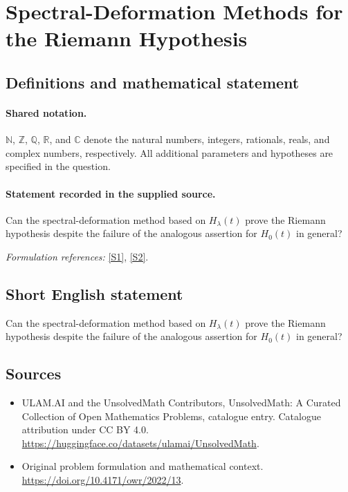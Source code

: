 \documentclass[11pt]{article}
\newcommand{\sref}[2]{\hyperlink{source:#1:#2}{[S#2]}}
\begin{document}
\section{Spectral-Deformation Methods for the Riemann Hypothesis}\label{statement}

\subsection{Definitions and mathematical statement}

\paragraph{Shared notation.}$\mathbb N$, $\mathbb Z$, $\mathbb Q$, $\mathbb R$, and $\mathbb C$ denote the natural numbers, integers, rationals, reals, and complex numbers, respectively. All additional parameters and hypotheses are specified in the question.


\paragraph{Statement recorded in the supplied source.}
Can the spectral-deformation method based on $H_\lambda(t)$ prove the Riemann hypothesis despite the failure of the analogous assertion for $H_0(t)$ in general?
\par\smallskip\textit{Formulation references:} \sref{statement}{1}, \sref{statement}{2}.
\subsection{Short English statement}
Can the spectral-deformation method based on $H_\lambda(t)$ prove the Riemann hypothesis despite the failure of the analogous assertion for $H_0(t)$ in general?
\subsection{Sources}
\begin{itemize}
\item[\hypertarget{source:statement:1}{S1}] ULAM.AI and the UnsolvedMath Contributors, UnsolvedMath: A Curated Collection of Open Mathematics Problems, catalogue entry. Catalogue attribution under CC BY 4.0.
\url{https://huggingface.co/datasets/ulamai/UnsolvedMath}.
\item[\hypertarget{source:statement:2}{S2}] Original problem formulation and mathematical context.
\url{https://doi.org/10.4171/owr/2022/13}.
\end{itemize}
\label{end:statement}
\end{document}
